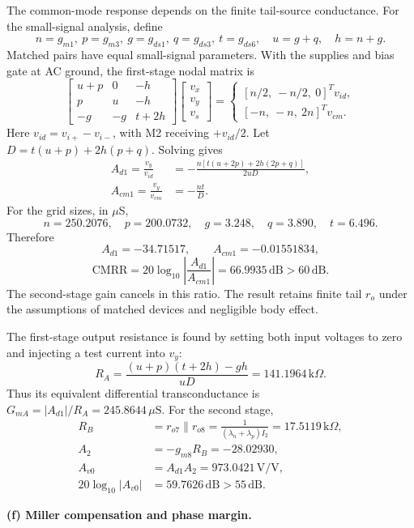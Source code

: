 \documentclass[12pt,letterpaper]{article}
\newcommand{\uS}{\,\mu\mathrm{S}}
\newcommand{\kohm}{\,\mathrm{k}\Omega}
\begin{document}
\begin{enumerate}
The common-mode response depends on the finite tail-source
conductance. For the small-signal analysis, define
\[
n=g_{m1},\ p=g_{m3},\ g=g_{ds1},\ q=g_{ds3},\
t=g_{ds6},\quad u=g+q,\quad h=n+g.
\]
Matched pairs have equal small-signal parameters. With the supplies
and bias gate at AC ground, the first-stage nodal matrix is
\[
\begin{bmatrix}
u+p&0&-h\\
p&u&-h\\
-g&-g&t+2h
\end{bmatrix}
\begin{bmatrix}v_x\\v_y\\v_s\end{bmatrix}
=
\begin{cases}
[n/2,\ -n/2,\ 0]^T v_{id},\\
[-n,\ -n,\ 2n]^T v_{cm}.
\end{cases}
\]
Here $v_{id}=v_{i+}-v_{i-}$, with M2 receiving $+v_{id}/2$.
Let $D=t(u+p)+2h(p+q)$. Solving gives
\begin{align*}
A_{d1}=\frac{v_y}{v_{id}}
&=-\frac{n[t(u+2p)+2h(2p+q)]}{2uD},\\
A_{cm1}=\frac{v_y}{v_{cm}}&=-\frac{nt}{D}.
\end{align*}
For the grid sizes, in $\mu$S,
\[
n=250.2076,\quad p=200.0732,\quad
g=3.248,\quad q=3.890,\quad t=6.496.
\]
Therefore
\[
A_{d1}=-34.71517,\qquad A_{cm1}=-0.01551834,
\]
\[
\boxed{\mathrm{CMRR}=20\log_{10}
\left|\frac{A_{d1}}{A_{cm1}}\right|=66.9935\,\mathrm{dB}>60\,\mathrm{dB}.}
\]
The second-stage gain cancels in this ratio. The result retains
finite tail $r_o$ under the assumptions of matched devices and
negligible body effect.

The first-stage output resistance is found by setting both input
voltages to zero and injecting a test current into $v_y$:
\[
R_A=\frac{(u+p)(t+2h)-gh}{uD}=141.1964\kohm.
\]
Thus its equivalent differential transconductance is
$G_{mA}=|A_{d1}|/R_A=245.8644\uS$.
For the second stage,
\begin{align*}
R_B&=r_{o7}\parallel r_{o8}
=\frac{1}{(\lambda_n+\lambda_p)I_2}=17.5119\kohm,\\
A_2&=-g_{m8}R_B=-28.02930,\\
A_{v0}&=A_{d1}A_2=973.0421\,\mathrm{V/V},\\
20\log_{10}|A_{v0}|&=\boxed{59.7626\,\mathrm{dB}>55\,\mathrm{dB}}.
\end{align*}

\newpage
\textbf{(f) Miller compensation and phase margin.}


\end{enumerate}
\end{document}
